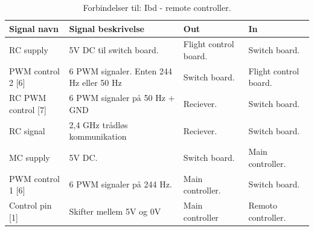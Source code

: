 \begin{table}[H]
	\centering
		\begin{tabular}{|p{3.5 cm}|p{4.5 cm}|p{2.6 cm}|p{2.6 cm}|} 
		\hline
			\textbf{Signal navn} 	& \textbf{Signal beskrivelse}		& \textbf{Out} 				& \textbf{In}     \\ \hline
			RC supply & 5V DC til switch board. & Flight control board. & Switch board.	\\ \hline	
			PWM control 2 [6] & 6 PWM signaler. \newline Enten 244 Hz eller 50 Hz & Switch board. & Flight control board.				\\ \hline
					
			RC PWM control [7] & 6 PWM signaler på 50 Hz \newline + GND & Reciever. & Switch board.				\\ \hline
			RC signal & 2,4 GHz trådløs \newline kommunikation & Reciever. & Switch board.				\\ \hline
			
			MC supply 			& 5V DC. 						& Switch board.  & Main \newline controller.	\\ \hline
			PWM control 1 [6] 	& 6 PWM signaler på 244 Hz. 	& Main controller. & Switch board. \\ \hline
			Control pin [1]		& Skifter mellem 5V og 0V		& Main controller	& Remoto \newline  controller.    \\ \hline
		\end{tabular}
	\caption{Forbindelser til: Ibd - remote controller. }
	\label{tab:ibd_remote_controller}
\end{table}




